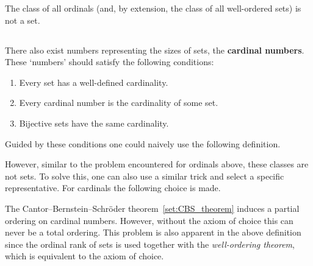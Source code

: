     \begin{property}
        The class of all ordinals (and, by extension, the class of all well-ordered sets) is not a set.
    \end{property}

\subsection{}

    There also exist numbers representing the sizes of sets, the \textbf{cardinal numbers}. These `numbers' should satisfy the following conditions:
    \begin{enumerate}
        \item Every set has a well-defined cardinality.
        \item Every cardinal number is the cardinality of some set.
        \item Bijective sets have the same cardinality.
    \end{enumerate}
    Guided by these conditions one could naively use the following definition.

    However, similar to the problem encountered for ordinals above, these classes are not sets. To solve this, one can also use a similar trick and select a specific representative. For cardinals the following choice is made.

    \begin{remark}[Ordering]
        The Cantor--Bernstein--Schr\"oder theorem~\ref{set:CBS_theorem} induces a partial ordering on cardinal numbers. However, without the axiom of choice this can never be a total ordering. This problem is also apparent in the above definition since the ordinal rank of sets is used together with the \textit{well-ordering theorem}, which is equivalent to the axiom of choice.
    \end{remark}

